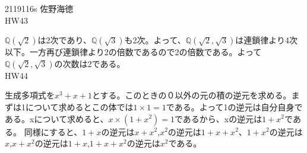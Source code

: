 \documentclass[11pt]{jsarticle}
\begin{document}
2119116s 佐野海徳\\
HW43
\par $\mathbb{Q}(\sqrt{2})$は2次であり、$\mathbb{Q}(\sqrt{3})$も2次。よって、$\mathbb{Q}(\sqrt{2},\sqrt{3})$は連鎖律より4次以下。一方再び連鎖律より2の倍数であるので2の倍数である。よって$\mathbb{Q}(\sqrt{2},\sqrt{3})$の次数は2である。
\\HW44
\par 生成多項式を$x^3 + x + 1$とする。このときの０以外の元の積の逆元を求める。まずは1について求めるとこの体では$1 \times 1 = 1$である。よって1の逆元は自分自身である。xについて求めると、$x \times (1 + x^2) = 1$であるから、xの逆元は$1 + x^2$である。
同様にすると、$1 + x$の逆元は$x + x^2$,$x^2$の逆元は$1 + x + x^2$、$1 + x^2$の逆元は$x$,$x + x^2$の逆元は$1 + x$,$1 + x + x^2$の逆元は$x^2$である。
\end{document}
